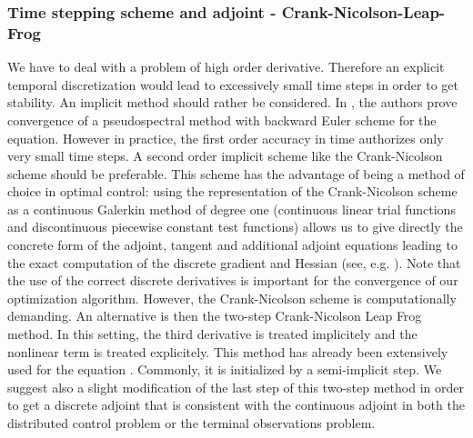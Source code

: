 \subsubsection{Time stepping scheme and adjoint - Crank-Nicolson-Leap-Frog}
\label{numadjoint}
We have to deal with a problem of high order derivative. Therefore an explicit temporal discretization would lead to excessively small time steps in order to get stability. An implicit method should rather be considered. In \cite{li2000error}, the authors prove convergence of a pseudospectral method with backward Euler scheme for the \KdV equation. However in practice, the first order accuracy in time authorizes only very small time steps. A second order implicit scheme like the Crank-Nicolson scheme should be preferable. This scheme has the advantage of being a method of choice in optimal control: using the representation of the Crank-Nicolson scheme as a continuous Galerkin method of degree one (continuous linear trial functions and discontinuous piecewise constant test functions) allows us to give directly the concrete form of the adjoint, tangent and additional adjoint equations leading to the exact computation of the discrete gradient and Hessian (see, e.g. \cite{meidner2007adaptive}). Note that the use of the correct discrete derivatives is important for the convergence of our optimization algorithm. However, the Crank-Nicolson scheme is computationally demanding. An alternative is then the two-step Crank-Nicolson Leap Frog method. In this setting, the third derivative is treated implicitely and the nonlinear term is treated explicitely. This method has already been extensively used for the \KdV equation \cite{shen2003new,ma2000legendre,ma2001optimal}.
Commonly, it is initialized by a semi-implicit step. We suggest also a slight modification of the last step of this two-step method in order to get a discrete adjoint that is consistent with the continuous adjoint in both the distributed control problem or the terminal observations problem.


